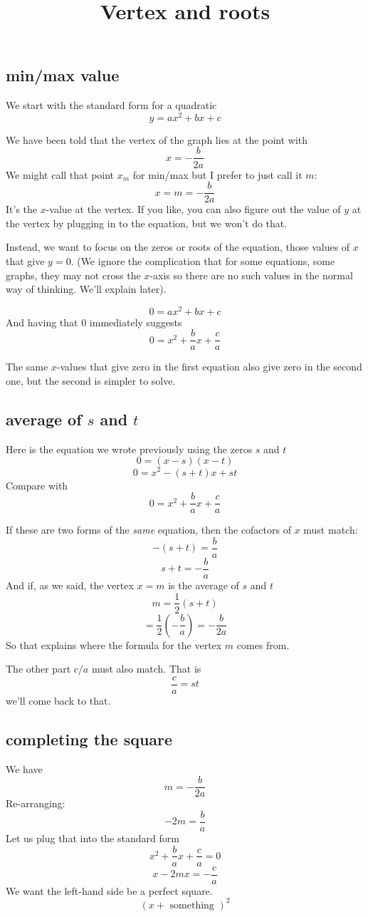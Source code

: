 \documentclass[11pt, oneside]{article}
\title{Vertex and roots}
\date{}
\begin{document}
\maketitle
\Large


\subsection*{min/max value}
We start with the standard form for a quadratic
\[ y = ax^2 + bx + c \]

We have been told that the vertex of the graph lies at the point with
\[ x = - \frac{b}{2a} \]
We might call that point $x_m$ for min/max but I prefer to just call it $m$: 
\[ x = m = - \frac{b}{2a} \]
It's the $x$-value at the vertex.  If you like, you can also figure out the value of $y$ at the vertex by plugging in to the equation, but we won't do that.

Instead, we want to focus on the zeros or roots of the equation, those values of $x$ that give $y = 0$.  (We ignore the complication that for some equations, some graphs, they may not cross the $x$-axis so there are no such values in the normal way of thinking.  We'll explain later).

\[ 0 = ax^2 + bx + c \]
And having that $0$ immediately suggests 
\[ 0 = x^2 + \frac{b}{a}x + \frac{c}{a} \]

The same $x$-values that give zero in the first equation also give zero in the second one, but the second is simpler to solve.

\subsection*{average of $s$ and $t$}
Here is the equation we wrote previously using the zeros $s$ and $t$
\[ 0 = (x - s)(x - t) \]
\[ 0 = x^2 - (s + t)x + st \]
Compare with
\[ 0 = x^2 + \frac{b}{a}x + \frac{c}{a} \]

If these are two forms of the \emph{same} equation, then the cofactors of $x$ must match:
\[ - (s + t) = \frac{b}{a} \]
\[ s + t =  - \frac{b}{a} \]
And if, as we said, the vertex $x = m$ is the average of $s$ and $t$
\[ m = \frac{1}{2} (s + t)\]
\[  = \frac{1}{2} (- \frac{b}{a}) = - \frac{b}{2a} \]
So that explains where the formula for the vertex $m$ comes from.

The other part $c/a$ must also match.  That is
\[ \frac{c}{a} = st \]
we'll come back to that.

\subsection*{completing the square}
We have 
\[ m = - \frac{b}{2a} \]
Re-arranging:
\[ -2m = \frac{b}{a} \]
Let us plug that into the standard form
\[ x^2 + \frac{b}{a} x + \frac{c}{a} = 0 \]
\[ x - 2mx = - \frac{c}{a} \]
We want the left-hand side be a perfect square.
\[ (x + \text{ something })^2 \]
\end{document}
